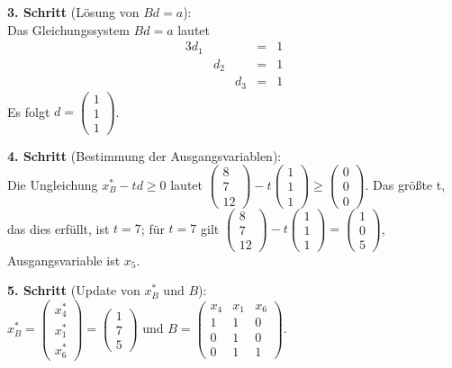\documentclass[10pt,a4paper,oneside,ngerman,numbers=noenddot]{scrartcl}
\begin{document}
		\textbf{3. Schritt} (Lösung von $Bd = a$):\\
		Das Gleichungssystem $Bd = a$ lautet
		\begin{alignat*}{3}
			d_{1} & & &=& 1 \\
			& d_{2} & &=& 1 \\
			& & d_{3} &=& 1
		\end{alignat*}
		Es folgt $d = \begin{pmatrix}1 \\ 1 \\ 1 \end{pmatrix}$.
		
		\textbf{4. Schritt} (Bestimmung der Ausgangsvariablen):\\
		Die Ungleichung $x_{B}^{*} - td \geq 0$ lautet $\begin{pmatrix} 8 \\ 7 \\ 12\end{pmatrix} - t \begin{pmatrix}1 \\ 1 \\ 1 \end{pmatrix} \geq \begin{pmatrix} 0 \\ 0 \\ 0 \end{pmatrix}$. Das größte t, das dies erfüllt, ist $t = 7$; für $t = 7$ gilt $\begin{pmatrix} 8 \\ 7 \\ 12\end{pmatrix} - t \begin{pmatrix}1 \\ 1 \\ 1 \end{pmatrix} = \begin{pmatrix} 1 \\ 0 \\ 5 \end{pmatrix}$, Ausgangsvariable ist $x_{5}$.
		
		\textbf{5. Schritt} (Update von $x_{B}^{*}$ und $B$):\\
		$x_{B}^{*} = \begin{pmatrix} x_{4}^{*} \\ x_{1}^{*} \\ x_{6}^{*} \end{pmatrix} = \begin{pmatrix} 1 \\ 7 \\ 5 \end{pmatrix}$ und $B = \begin{pmatrix} x_{4} & x_{1} & x_{6} \\ 1 & 1 & 0 \\ 0 & 1 & 0 \\ 0 & 1 & 1 \end{pmatrix}$.
		
\end{document}
